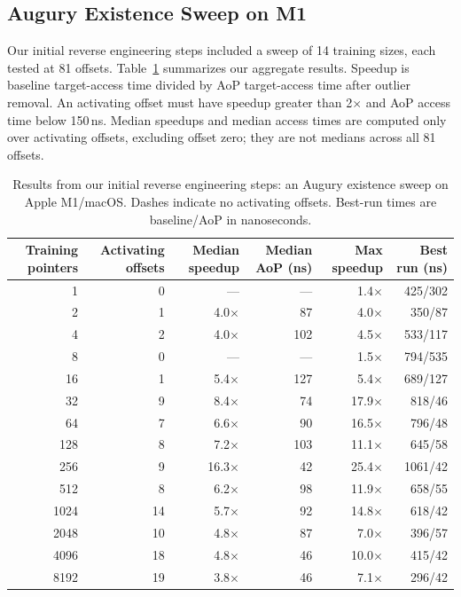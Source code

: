 \subsection{Augury Existence Sweep on M1}
Our initial reverse engineering steps included a sweep of 14 training sizes, each tested at 81 offsets. Table~\ref{tab:existence} summarizes our aggregate results. Speedup is baseline target-access time divided by AoP target-access time after outlier removal. An activating offset must have speedup greater than 2$\times$ and AoP access time below 150\,ns. Median speedups and median access times are computed only over activating offsets, excluding offset zero; they are not medians across all 81 offsets.

\begin{table}[t]
\caption{Results from our initial reverse engineering steps: an Augury existence sweep on Apple M1/macOS. Dashes indicate no activating offsets. Best-run times are baseline/AoP in nanoseconds.}
\label{tab:existence}
\centering
\small
\begin{tabular}{rrrrrr}
\toprule
Training pointers & Activating offsets & Median speedup & Median AoP (ns) & Max speedup & Best run (ns) \\
\midrule
1    & 0  & --- & --- & 1.4$\times$ & 425/302 \\
2    & 1  & 4.0$\times$ & 87  & 4.0$\times$ & 350/87 \\
4    & 2  & 4.0$\times$ & 102 & 4.5$\times$ & 533/117 \\
8    & 0  & --- & --- & 1.5$\times$ & 794/535 \\
16   & 1  & 5.4$\times$ & 127 & 5.4$\times$ & 689/127 \\
32   & 9  & 8.4$\times$ & 74  & 17.9$\times$ & 818/46 \\
64   & 7  & 6.6$\times$ & 90  & 16.5$\times$ & 796/48 \\
128  & 8  & 7.2$\times$ & 103 & 11.1$\times$ & 645/58 \\
256  & 9  & 16.3$\times$ & 42 & 25.4$\times$ & 1061/42 \\
512  & 8  & 6.2$\times$ & 98  & 11.9$\times$ & 658/55 \\
1024 & 14 & 5.7$\times$ & 92  & 14.8$\times$ & 618/42 \\
2048 & 10 & 4.8$\times$ & 87  & 7.0$\times$ & 396/57 \\
4096 & 18 & 4.8$\times$ & 46  & 10.0$\times$ & 415/42 \\
8192 & 19 & 3.8$\times$ & 46  & 7.1$\times$ & 296/42 \\
\bottomrule
\end{tabular}
\end{table}


